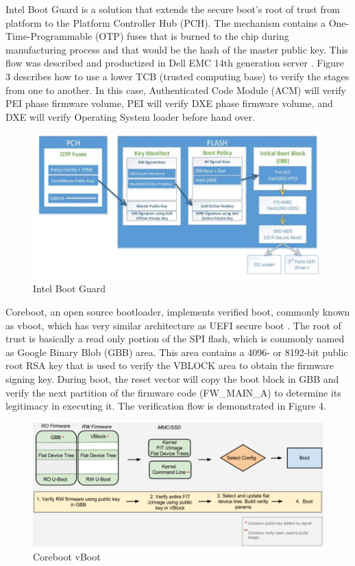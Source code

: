 \documentclass[review]{elsarticle}
\begin{document}
Intel Boot Guard is a solution that extends the secure boot’s root of trust from platform to the Platform Controller Hub (PCH). The mechanism contains a One-Time-Programmable (OTP) fuses that is burned to the chip during manufacturing process and that would be the hash of the master public key. This flow was described and productized in Dell EMC 14th generation server \cite{R5:14} . Figure 3 describes how to use a lower TCB (trusted computing base) to verify the stages from one to another. In this case, Authenticated Code Module (ACM) will verify PEI phase firmware volume, PEI will verify DXE phase firmware volume, and DXE will verify Operating System loader before hand over.

\begin{figure}[H]
	\centering
	\includegraphics[width=1\textwidth]{figs/IntelBootGuard.JPG}
	\caption{Intel Boot Guard \cite{R5:14}}
\end{figure}


Coreboot, an open source bootloader, implements verified boot, commonly known as vboot, which has very similar architecture as UEFI secure boot \cite{R5:16}. The root of trust is basically a read only portion of the SPI flash, which is commonly named as Google Binary Blob (GBB) area. This area contains a 4096- or 8192-bit public root RSA key that is used to verify the VBLOCK area to obtain the firmware signing key. During boot, the reset vector will copy the boot block in GBB and verify the next partition of the firmware code (FW\_MAIN\_A) to determine its legitimacy in executing it. The verification flow is demonstrated in Figure 4.
 

\begin{figure}[H]
	\centering
	\includegraphics[width=1\textwidth]{figs/CorebootVboot.JPG}
	\caption{Coreboot vBoot \cite{R5:16}}
\end{figure}
\end{document}
